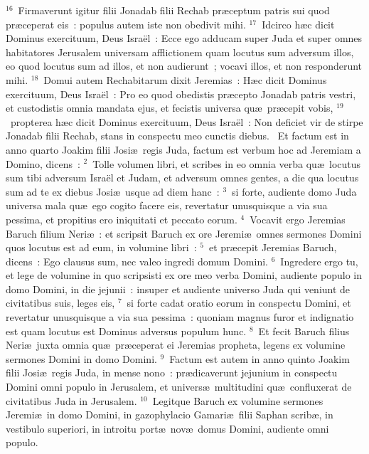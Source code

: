 ${}^{16}$~Firmaverunt igitur filii Jonadab filii Rechab pr\ae ceptum patris sui quod pr\ae ceperat eis~: populus autem iste non obedivit mihi.
${}^{17}$~Idcirco h\ae c dicit Dominus exercituum, Deus Isra\"el~: Ecce ego adducam super Juda et super omnes habitatores Jerusalem universam afflictionem quam locutus sum adversum illos, eo quod locutus sum ad illos, et non audierunt~; vocavi illos, et non responderunt mihi.
${}^{18}$~Domui autem Rechabitarum dixit Jeremias~: H\ae c dicit Dominus exercituum, Deus Isra\"el~: Pro eo quod obedistis pr\ae cepto Jonadab patris vestri, et custodistis omnia mandata ejus, et fecistis universa qu\ae\ pr\ae cepit vobis,
${}^{19}$~propterea h\ae c dicit Dominus exercituum, Deus Isra\"el~: Non deficiet vir de stirpe Jonadab filii Rechab, stans in conspectu meo cunctis diebus.
~Et factum est in anno quarto Joakim filii Josi\ae\ regis Juda, factum est verbum hoc ad Jeremiam a Domino, dicens~:
${}^{2}$~Tolle volumen libri, et scribes in eo omnia verba qu\ae\ locutus sum tibi adversum Isra\"el et Judam, et adversum omnes gentes, a die qua locutus sum ad te ex diebus Josi\ae\ usque ad diem hanc~:
${}^{3}$~si forte, audiente domo Juda universa mala qu\ae\ ego cogito facere eis, revertatur unusquisque a via sua pessima, et propitius ero iniquitati et peccato eorum.
${}^{4}$~Vocavit ergo Jeremias Baruch filium Neri\ae~: et scripsit Baruch ex ore Jeremi\ae\ omnes sermones Domini quos locutus est ad eum, in volumine libri~:
${}^{5}$~et pr\ae cepit Jeremias Baruch, dicens~: Ego clausus sum, nec valeo ingredi domum Domini.
${}^{6}$~Ingredere ergo tu, et lege de volumine in quo scripsisti ex ore meo verba Domini, audiente populo in domo Domini, in die jejunii~: insuper et audiente universo Juda qui veniunt de civitatibus suis, leges eis,
${}^{7}$~si forte cadat oratio eorum in conspectu Domini, et revertatur unusquisque a via sua pessima~: quoniam magnus furor et indignatio est quam locutus est Dominus adversus populum hunc.
${}^{8}$~Et fecit Baruch filius Neri\ae\ juxta omnia qu\ae\ pr\ae ceperat ei Jeremias propheta, legens ex volumine sermones Domini in domo Domini.
${}^{9}$~Factum est autem in anno quinto Joakim filii Josi\ae\ regis Juda, in mense nono~: pr\ae dicaverunt jejunium in conspectu Domini omni populo in Jerusalem, et univers\ae\ multitudini qu\ae\ confluxerat de civitatibus Juda in Jerusalem.
${}^{10}$~Legitque Baruch ex volumine sermones Jeremi\ae\ in domo Domini, in gazophylacio Gamari\ae\ filii Saphan scrib\ae , in vestibulo superiori, in introitu port\ae\ nov\ae\ domus Domini, audiente omni populo.
